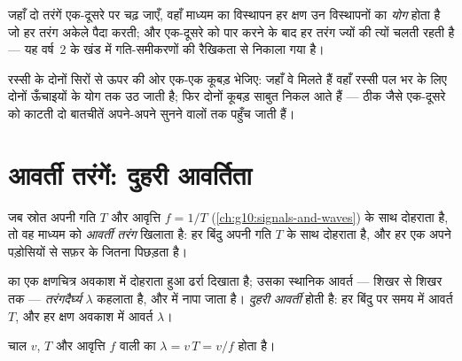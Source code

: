 \begin{proposition}[बिना अंतःक्रिया अध्यारोपण]\label{prop:g12:mechanical-waves:superposition}
जहाँ दो तरंगें एक-दूसरे पर चढ़ जाएँ, वहाँ माध्यम का विस्थापन हर क्षण
उन विस्थापनों का \emph{योग} होता है जो हर तरंग अकेले पैदा करती; और एक-दूसरे
को पार करने के बाद हर तरंग ज्यों की त्यों चलती रहती है --- यह वर्ष~2
के खंड में गति-समीकरणों की रैखिकता से निकाला गया है। \admitted
\end{proposition}

\begin{example}[एक-दूसरे को पार करती स्पंदें]\label{ex:g12:mechanical-waves:crossing}
रस्सी के दोनों सिरों से ऊपर की ओर एक-एक कूबड़ भेजिए: जहाँ वे मिलते हैं वहाँ
रस्सी पल भर के लिए दोनों ऊँचाइयों के योग तक उठ जाती है; फिर दोनों कूबड़ साबुत
निकल आते हैं --- ठीक जैसे एक-दूसरे को काटती दो बातचीतें अपने-अपने सुनने वालों
तक पहुँच जाती हैं।
\end{example}

\section{आवर्ती तरंगें: दुहरी आवर्तिता}

\begin{definition}[आवर्ती तरंग]\label{def:g12:mechanical-waves:periodic}
जब स्रोत अपनी गति  $T$ और आवृत्ति $f = 1/T$ (\cref{ch:g10:signals-and-waves})
के साथ दोहराता है, तो वह माध्यम को \emph{आवर्ती तरंग}
खिलाता है: हर बिंदु अपनी गति  $T$ के साथ दोहराता है, और हर
एक अपने पड़ोसियों से सफ़र के  जितना पिछड़ता है।
\end{definition}

\begin{definition}[तरंगदैर्घ्य]\label{def:g12:mechanical-waves:wavelength}
 का एक क्षणचित्र अवकाश में दोहराता हुआ ढर्रा दिखाता है;
उसका स्थानिक आवर्त --- शिखर से शिखर तक --- \emph{तरंगदैर्घ्य}
$\lambda$ कहलाता है, और  में नापा जाता है। 
\emph{दुहरी आवर्ती} होती है: हर बिंदु पर समय में
आवर्त $T$, और हर क्षण अवकाश में आवर्त $\lambda$।
\end{definition}

\begin{theorem}[तरंग-संबंध]\label{thm:g12:mechanical-waves:relation}
चाल $v$,  $T$ और आवृत्ति $f$ वाली
 का  $\lambda = v\,T = v/f$ होता है।
\end{theorem}


